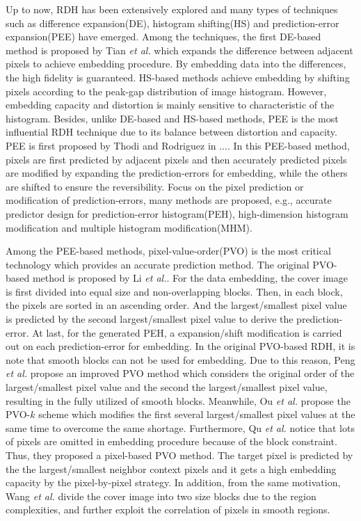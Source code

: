 \documentclass[review,3p,10pt,sort&compress]{elsarticle}
\begin{document}
Up to now, RDH has been extensively explored and many types of techniques such as difference expansion(DE), histogram shifting(HS) and prediction-error expansion(PEE) have emerged. Among the techniques, the first DE-based method is proposed by Tian \emph{et al.} which expands the difference between adjacent pixels to achieve embedding procedure. By embedding data into the differences, the high fidelity is guaranteed. HS-based methods achieve embedding by shifting pixels according to the peak-gap distribution of image histogram. However, embedding capacity and distortion is mainly sensitive to characteristic of the histogram. Besides, unlike DE-based and HS-based methods, PEE is the most influential RDH technique due to its balance between distortion and capacity. PEE is first proposed by Thodi and Rodriguez in .... In this PEE-based method, pixels are first predicted by adjacent pixels and then accurately predicted pixels are modified by expanding the prediction-errors for embedding, while the others are shifted to ensure the reversibility. Focus on the pixel prediction or modification of prediction-errors, many methods are proposed, e.g., accurate predictor design for prediction-error histogram(PEH), high-dimension histogram modification and multiple histogram modification(MHM).

Among the PEE-based methods, pixel-value-order(PVO) is the most critical technology which provides an accurate prediction method. The original PVO-based method is proposed by Li \emph{et al.}. For the data embedding, the cover image is first divided into equal size and non-overlapping blocks. Then, in each block, the pixels are sorted in an ascending order. And the largest/smallest pixel value is predicted by the second largest/smallest pixel value to derive the prediction-error. At last, for the generated PEH, a expansion/shift modification is carried out on each prediction-error for embedding. In the original PVO-based RDH, it is note that smooth blocks can not be used for embedding. Due to this reason, Peng \emph{et al.} propose an improved PVO method which considers the original order of the largest/smallest pixel value and the second the largest/smallest pixel value, resulting in the fully utilized of smooth blocks. Meanwhile, Ou \emph{et al.} propose the PVO-$k$ scheme which modifies the first several largest/smallest pixel values at the same time to overcome the same shortage. Furthermore, Qu \emph{et al.} notice that lots of pixels are omitted in embedding procedure because of the block constraint. Thus, they proposed a pixel-based PVO method. The target pixel is predicted by the the largest/smallest neighbor context pixels and it gets a high embedding capacity by the pixel-by-pixel strategy.
In addition, from the same motivation, Wang \emph{et al.} divide the cover image into two size blocks due to the region complexities, and further exploit the correlation of pixels in smooth regions.
\end{document}
